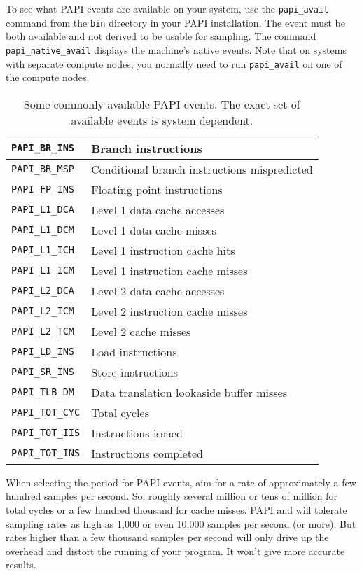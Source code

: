 To see what PAPI events are available on your system, use the
\verb|papi_avail| command from the {\tt bin} directory in your PAPI
installation.  The event must be both available and not derived to be
usable for sampling.  The command \verb|papi_native_avail| displays
the machine's native events.  Note that on systems with separate
compute nodes, you normally need to run \verb|papi_avail| on one of
the compute nodes.

\begin{table}
\begin{center}
\begin{tabular}{|l|l|}
\hline
\verb|PAPI_BR_INS| & Branch instructions \\
\hline
\verb|PAPI_BR_MSP| & Conditional branch instructions mispredicted \\
\hline
\verb|PAPI_FP_INS| & Floating point instructions \\
\hline
\verb|PAPI_L1_DCA| & Level 1 data cache accesses \\
\hline
\verb|PAPI_L1_DCM| & Level 1 data cache misses \\
\hline
\verb|PAPI_L1_ICH| & Level 1 instruction cache hits \\
\hline
\verb|PAPI_L1_ICM| & Level 1 instruction cache misses \\
\hline
\verb|PAPI_L2_DCA| & Level 2 data cache accesses \\
\hline
\verb|PAPI_L2_ICM| & Level 2 instruction cache misses \\
\hline
\verb|PAPI_L2_TCM| & Level 2 cache misses \\
\hline
\verb|PAPI_LD_INS| & Load instructions \\
\hline
\verb|PAPI_SR_INS| & Store instructions \\
\hline
\verb|PAPI_TLB_DM| & Data translation lookaside buffer misses \\
\hline
\verb|PAPI_TOT_CYC| & Total cycles \\
\hline
\verb|PAPI_TOT_IIS| & Instructions issued \\
\hline
\verb|PAPI_TOT_INS| & Instructions completed \\
\hline
\end{tabular}
\end{center}
\caption{Some commonly available PAPI events.
The exact set of available events is system dependent.}
\label{tab:papi-events}
\end{table}

When selecting the period for PAPI events, aim for a rate of
approximately a few hundred samples per second.  So, roughly several
million or tens of million for total cycles or a few hundred thousand
for cache misses.  PAPI and \hpcrun{} will tolerate sampling rates as
high as 1,000 or even 10,000 samples per second (or more).  But rates
higher than a few thousand samples per second will only drive up the
overhead and distort the running of your program.  It won't give more
accurate results.

